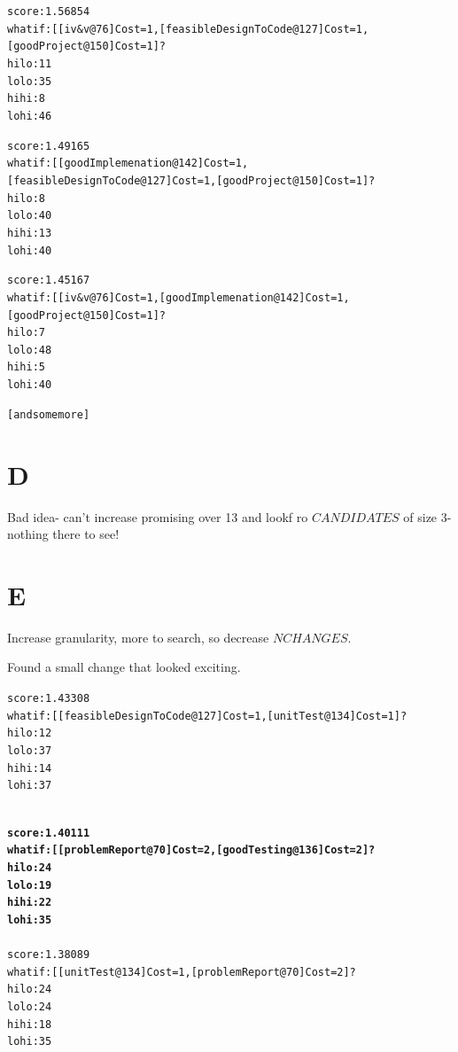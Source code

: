 \documentclass{article}
\begin{document}
 {\footnotesize \begin{alltt}

          score : 1.56854
        what if : [[iv&v@76]Cost=1, [feasibleDesignToCode@127]Cost=1, [goodProject@150]Cost=1]?
           hilo :   11%
           lolo :   35%
           hihi :    8%
           lohi :   46%

          score : 1.49165
        what if : [[goodImplemenation@142]Cost=1, [feasibleDesignToCode@127]Cost=1, [goodProject@150]Cost=1]?
           hilo :    8%
           lolo :   40%
           hihi :   13%
           lohi :   40%

          score : 1.45167
        what if : [[iv&v@76]Cost=1, [goodImplemenation@142]Cost=1, [goodProject@150]Cost=1]?
           hilo :    7%
           lolo :   48%
           hihi :    5%
           lohi :   40%

           [and some more]
           \end{alltt}}


\section{D}
Bad idea- can't increase promising over 13 and lookf ro $CANDIDATES$ of size 3- nothing there to see!

\section{E}

Increase granularity, more to search,
                                                so decrease $NCHANGES$.

                                                Found a small change
                                                that looked exciting.

{\footnotesize \begin{alltt}
          score : 1.43308
        what if : [[feasibleDesignToCode@127]Cost=1, [unitTest@134]Cost=1]?
           hilo :   12%
           lolo :   37%
           hihi :   14%
           lohi :   37%

{\bf
          score : 1.40111
        what if : [[problemReport@70]Cost=2, [goodTesting@136]Cost=2]?
           hilo :   24%
           lolo :   19%
           hihi :   22%
           lohi :   35%
}
          score : 1.38089
        what if : [[unitTest@134]Cost=1, [problemReport@70]Cost=2]?
           hilo :   24%
           lolo :   24%
           hihi :   18%
           lohi :   35%
\end{alltt}}
\end{document}
